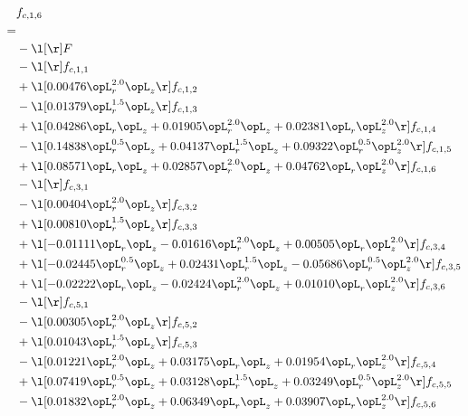 \begin{alignat}{2} 
\label{eq:f_16_1} 
& f_{c,1,6} \nonumber \\ 
 = \\ 
& - \l[  \r] F \nonumber \\ 
& - \l[  \r] f_{c,1,1} \nonumber \\ 
& + \l[  0.00476 \opL_r^{2.0} \opL_z  \r] f_{c,1,2} \nonumber \\ 
& - \l[  0.01379 \opL_r^{1.5} \opL_z  \r] f_{c,1,3} \nonumber \\ 
& + \l[  0.04286 \opL_r \opL_z +  0.01905 \opL_r^{2.0} \opL_z +  0.02381 \opL_r \opL_z^{2.0}  \r] f_{c,1,4} \nonumber \\ 
& - \l[  0.14838 \opL_r^{0.5} \opL_z +  0.04137 \opL_r^{1.5} \opL_z +  0.09322 \opL_r^{0.5} \opL_z^{2.0}  \r] f_{c,1,5} \nonumber \\ 
& + \l[  0.08571 \opL_r \opL_z +  0.02857 \opL_r^{2.0} \opL_z +  0.04762 \opL_r \opL_z^{2.0}  \r] f_{c,1,6} \nonumber \\ 
& - \l[  \r] f_{c,3,1} \nonumber \\ 
& - \l[  0.00404 \opL_r^{2.0} \opL_z  \r] f_{c,3,2} \nonumber \\ 
& + \l[  0.00810 \opL_r^{1.5} \opL_z  \r] f_{c,3,3} \nonumber \\ 
& + \l[  -0.01111 \opL_r \opL_z   -0.01616 \opL_r^{2.0} \opL_z +  0.00505 \opL_r \opL_z^{2.0}  \r] f_{c,3,4} \nonumber \\ 
& + \l[  -0.02445 \opL_r^{0.5} \opL_z +  0.02431 \opL_r^{1.5} \opL_z   -0.05686 \opL_r^{0.5} \opL_z^{2.0}  \r] f_{c,3,5} \nonumber \\ 
& + \l[  -0.02222 \opL_r \opL_z   -0.02424 \opL_r^{2.0} \opL_z +  0.01010 \opL_r \opL_z^{2.0}  \r] f_{c,3,6} \nonumber \\ 
& - \l[  \r] f_{c,5,1} \nonumber \\ 
& - \l[  0.00305 \opL_r^{2.0} \opL_z  \r] f_{c,5,2} \nonumber \\ 
& + \l[  0.01043 \opL_r^{1.5} \opL_z  \r] f_{c,5,3} \nonumber \\ 
& - \l[  0.01221 \opL_r^{2.0} \opL_z +  0.03175 \opL_r \opL_z +  0.01954 \opL_r \opL_z^{2.0}  \r] f_{c,5,4} \nonumber \\ 
& + \l[  0.07419 \opL_r^{0.5} \opL_z +  0.03128 \opL_r^{1.5} \opL_z +  0.03249 \opL_r^{0.5} \opL_z^{2.0}  \r] f_{c,5,5} \nonumber \\ 
& - \l[  0.01832 \opL_r^{2.0} \opL_z +  0.06349 \opL_r \opL_z +  0.03907 \opL_r \opL_z^{2.0}  \r] f_{c,5,6} \nonumber \\ 

\end{alignat}
